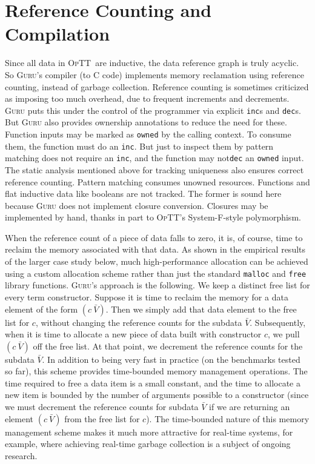 \documentclass[9pt,natbib]{sigplanconf}
\newcommand{\optt}{\textsc{OpTT}}
\newcommand{\guru}[0]{\textsc{Guru}}
\begin{document}
\section{Reference Counting and Compilation}
\label{sec:compilation}

Since all data in \optt\ are inductive, the data reference graph is
truly acyclic.  So \textsc{Guru}'s compiler (to C code) implements
memory reclamation using reference counting, instead of garbage
collection.  Reference counting is sometimes criticized as imposing
too much overhead, due to frequent increments and decrements.
\textsc{Guru} puts this under the control of the programmer via
explicit \texttt{inc}s and \texttt{dec}s.  But \textsc{Guru} also
provides ownership annotations to reduce the need for these.  Function
inputs may be marked as \texttt{owned} by the calling context.  To
consume them, the function must do an \texttt{inc}.  But just to
inspect them by pattern matching does not require an \texttt{inc}, and
the function may not\texttt{dec} an \texttt{owned} input.  The static
analysis mentioned above for tracking uniqueness also ensures correct
reference counting.  Pattern matching consumes unowned resources.
Functions and flat inductive data like booleans are not tracked.  The
former is sound here because \textsc{Guru} does not implement closure
conversion.  Closures may be implemented by hand, thanks in part to
\optt's System-F-style polymorphism.  

When the reference count of a piece of data falls to zero, it is, of
course, time to reclaim the memory associated with that data.  As
shown in the empirical results of the larger case study below, much
high-performance allocation can be achieved using a custom allocation
scheme rather than just the standard \texttt{malloc} and \texttt{free}
library functions.  \guru's approach is the following.  We keep a
distinct free list for every term constructor.  Suppose it is time to
reclaim the memory for a data element of the form $(c\ \bar{V})$.
Then we simply add that data element to the free list for $c$, without
changing the reference counts for the subdata $\bar{V}$.
Subsequently, when it is time to allocate a new piece of data built
with constructor $c$, we pull $(c\ \bar{V})$ off the free list.  At
that point, we decrement the reference counts for the subdata
$\bar{V}$.  In addition to being very fast in practice (on the
benchmarks tested so far), this scheme provides time-bounded memory
management operations.  The time required to free a data item is a
small constant, and the time to allocate a new item is bounded by the
number of arguments possible to a constructor (since we must decrement
the reference counts for subdata $\bar{V}$ if we are returning an
element $(c\ \bar{V})$ from the free list for $c$).  The time-bounded
nature of this memory management scheme makes it much more attractive
for real-time systems, for example, where achieving real-time garbage
collection is a subject of ongoing research.
\end{document}
